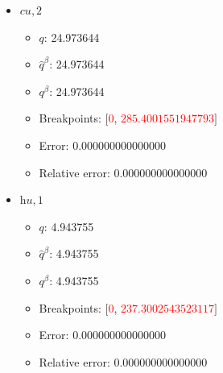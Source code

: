 \documentclass{article}%
\begin{document}
\begin{itemize}
\begin{itemize}
		\item Error: 0.000000000000000%
		\item Relative error: 0.000000000000000%
	\end{itemize}%
	\item $\textit{cu},2$%
	\begin{itemize}%
		\item $q$: 24.973644%
		\item $\hat{q}^\beta$: 24.973644%
		\item $q^\beta$: 24.973644%
		\item Breakpoints: $[$\textcolor{red}{$0$}, \textcolor{red}{$285.4001551947793$}$]$%
		\item Error: 0.000000000000000%
		\item Relative error: 0.000000000000000%
	\end{itemize}%
	\item $\textit{hu},1$%
	\begin{itemize}%
		\item $q$: 4.943755%
		\item $\hat{q}^\beta$: 4.943755%
		\item $q^\beta$: 4.943755%
		\item Breakpoints: $[$\textcolor{red}{$0$}, \textcolor{red}{$237.3002543523117$}$]$%
		\item Error: 0.000000000000000%
		\item Relative error: 0.000000000000000%
	\end{itemize}%
\end{itemize}%
\end{document}
